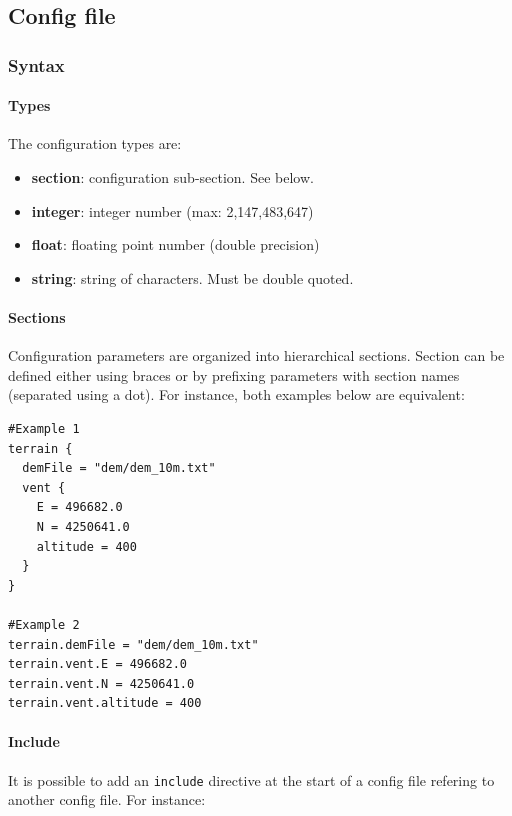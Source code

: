 \documentclass[10pt,a4paper]{article}
\begin{document}
\subsection{Config file}
\label{sec-4}

\subsubsection{Syntax}
\label{sec-4-1}

\paragraph{Types}
\label{sec-4-1-1}

The configuration types are:

\begin{itemize}
\item \textbf{section}: configuration sub-section. See below.
\item \textbf{integer}: integer number (max: 2,147,483,647)
\item \textbf{float}: floating point number (double precision)
\item \textbf{string}: string of characters. Must be double quoted.
\end{itemize}

\paragraph{Sections}
\label{sec-4-1-2}

Configuration parameters are organized into hierarchical sections. Section can be defined
either using braces or by prefixing parameters with section names (separated using a dot).
For instance, both examples below are equivalent:

\begin{verbatim}
#Example 1
terrain {
  demFile = "dem/dem_10m.txt"
  vent {
    E = 496682.0
    N = 4250641.0
    altitude = 400
  }
}

#Example 2
terrain.demFile = "dem/dem_10m.txt"
terrain.vent.E = 496682.0
terrain.vent.N = 4250641.0
terrain.vent.altitude = 400
\end{verbatim}

\paragraph{Include}
\label{sec-4-1-3}

It is possible to add an \texttt{include} directive at the start of a config file refering
to another config file. For instance:
\end{document}
